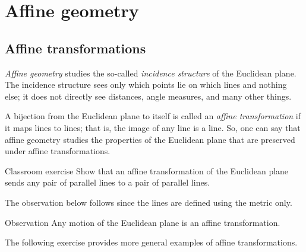 
\chapter{Affine geometry}\label{chap:trans}

\section{Affine transformations}

\emph{Affine geometry} studies the so-called \emph{incidence structure} of the Euclidean plane.
The incidence structure sees only which points lie on which lines and nothing else;
it does not directly see distances, angle measures, and many other things.

A bijection from the Euclidean plane to itself is called an \emph{affine transformation} if it maps lines to lines;
that is, the image of any line is a line.
So, one can say that affine geometry studies the properties of the Euclidean plane that are preserved under affine transformations.

\begin{thm}{Classroom exercise}\label{ex:affine-par}
Show that an affine transformation of the Euclidean plane sends any pair of parallel lines to a pair of parallel lines.
\end{thm}

The observation below follows since the lines are defined using the metric only.

\begin{thm}{Observation}
Any motion of the Euclidean plane is an affine transformation.
\end{thm}

The following exercise provides more general examples of affine transformations.

